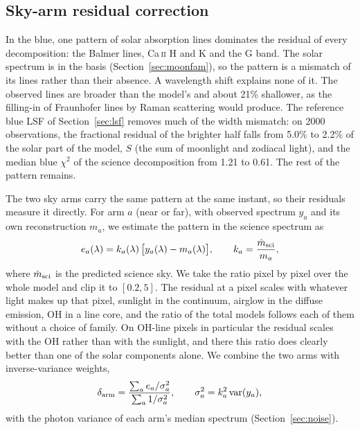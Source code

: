 \subsection{Sky-arm residual correction}
\label{sec:armcorr}

In the blue, one pattern of solar absorption lines dominates the residual of
every decomposition: the Balmer lines, Ca\,\textsc{ii} H and K and the G
band. The solar spectrum is in the basis (Section~\ref{sec:moonfam}), so
the pattern is a mismatch of its lines rather than their absence. A
wavelength shift explains none of it. The observed lines are broader than
the model's and about 21\% shallower, as the filling-in of Fraunhofer lines
by Raman scattering would produce. The reference blue LSF of
Section~\ref{sec:lsf} removes much of the width mismatch: on 2000
observations, the fractional residual of the brighter half falls from 5.0\%
to 2.2\% of the solar part of the model, $S$ (the sum of moonlight and
zodiacal light), and the median blue $\chi^2$ of the science decomposition
from 1.21 to 0.61. The rest of the pattern remains.

The two sky arms carry the same pattern at the same instant, so their
residuals measure it directly. For arm $a$ (near or far), with observed
spectrum $y_a$ and its own reconstruction $m_a$, we estimate the pattern in
the science spectrum as
\begin{equation}
  e_a(\lambda) = k_a(\lambda)\,\big[y_a(\lambda) - m_a(\lambda)\big],
  \qquad
  k_a = \frac{\hat m_{\rm sci}}{m_a},
  \label{eq:arm-estimate}
\end{equation}
where $\hat m_{\rm sci}$ is the predicted science sky. We take the ratio
pixel by pixel over the whole model and clip it to $[0.2, 5]$. The residual
at a pixel scales with whatever light makes up that pixel, sunlight in the
continuum, airglow in the diffuse emission, OH in a line core, and the ratio
of the total models follows each of them without a choice of family. On
OH-line pixels in particular the residual scales with the OH rather than
with the sunlight, and there this ratio does clearly better than one of the
solar components alone. We combine the two arms with inverse-variance
weights,
\begin{equation}
  \delta_{\rm arm} = \frac{\sum_a e_a/\sigma_a^2}{\sum_a 1/\sigma_a^2},
  \qquad
  \sigma_a^2 = k_a^2\operatorname{var}(y_a),
\end{equation}
with the photon variance of each arm's median spectrum
(Section~\ref{sec:noise}).

